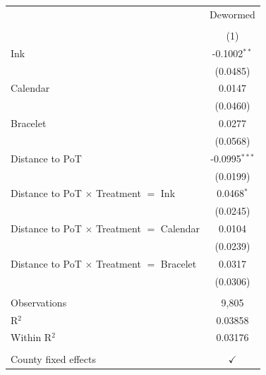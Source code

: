 
\begingroup
\centering
\begin{tabular}{lc}
   \toprule
                                                    & Dewormed\\  
                                                    &  \\   
                                                    & (1)\\  
   \midrule 
   Ink                                              & -0.1002$^{**}$\\   
                                                    & (0.0485)\\   
   Calendar                                         & 0.0147\\   
                                                    & (0.0460)\\   
   Bracelet                                         & 0.0277\\   
                                                    & (0.0568)\\   
   Distance to PoT                                  & -0.0995$^{***}$\\   
                                                    & (0.0199)\\   
   Distance to PoT $\times$ Treatment $=$ Ink       & 0.0468$^{*}$\\   
                                                    & (0.0245)\\   
   Distance to PoT $\times$ Treatment $=$ Calendar  & 0.0104\\   
                                                    & (0.0239)\\   
   Distance to PoT $\times$ Treatment $=$ Bracelet  & 0.0317\\   
                                                    & (0.0306)\\   
    \\
   Observations                                     & 9,805\\  
   R$^2$                                            & 0.03858\\  
   Within R$^2$                                     & 0.03176\\  
    \\
   County fixed effects                             & $\checkmark$\\   
   \bottomrule
\end{tabular}
\par\endgroup



